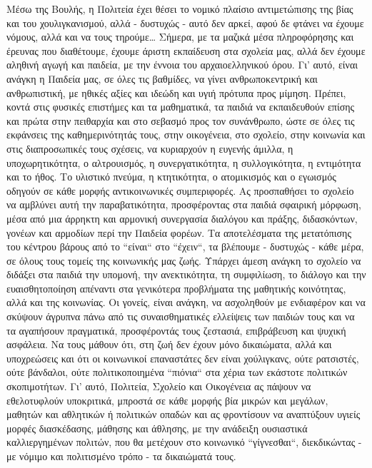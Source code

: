 \documentclass[12pt,a4paper]{book}
\begin{document}
\newline\setlength{\parindent}{40pt}\indent Μέσω της Βουλής, η Πολιτεία έχει
θέσει το νομικό πλαίσιο αντιμετώπισης της βίας και του χουλιγκανισμού,
αλλά - δυστυχώς - αυτό δεν αρκεί, αφού δε φτάνει να έχουμε νόμους, αλλά και να
τους τηρούμε\ldots
\newline\setlength{\parindent}{40pt}\indent Σήμερα, με τα μαζικά μέσα
πληροφόρησης και έρευνας που διαθέτουμε, έχουμε άριστη εκπαίδευση στα σχολεία
μας, αλλά δεν έχουμε αληθινή αγωγή και παιδεία, με την έννοια του
αρχαιοελληνικού όρου. Γι' αυτό, είναι ανάγκη η Παιδεία μας, σε όλες τις
βαθμίδες, να γίνει ανθρωποκεντρική και ανθρωπιστική, με ηθικές αξίες και ιδεώδη
και υγιή πρότυπα προς μίμηση. Πρέπει, κοντά στις φυσικές επιστήμες και τα
μαθηματικά, τα παιδιά να εκπαιδευθούν επίσης και πρώτα στην πειθαρχία και στο
σεβασμό προς τον συνάνθρωπο, ώστε σε όλες τις εκφάνσεις της καθημερινότητάς
τους, στην οικογένεια, στο σχολείο, στην κοινωνία και στις διαπροσωπικές τους
σχέσεις, να κυριαρχούν η ευγενής άμιλλα, η υποχωρητικότητα, ο αλτρουισμός, η
συνεργατικότητα, η συλλογικότητα, η εντιμότητα και το ήθος.
\newline\setlength{\parindent}{40pt}\indent Το υλιστικό πνεύμα, η κτητικότητα, ο ατομικισμός και ο εγωισμός οδηγούν σε κάθε μορφής αντικοινωνικές συμπεριφορές. Ας προσπαθήσει το σχολείο να αμβλύνει αυτή την παραβατικότητα, προσφέροντας στα παιδιά σφαιρική
μόρφωση, μέσα από μια άρρηκτη και αρμονική συνεργασία διαλόγου και πράξης,
διδασκόντων, γονέων και αρμοδίων περί την Παιδεία φορέων. Τα αποτελέσματα της
μετατόπισης του κέντρου βάρους από το ``είναι`` στο ``έχειν``, τα βλέπουμε -
δυστυχώς - κάθε μέρα, σε όλους τους τομείς της κοινωνικής μας ζωής. Υπάρχει
άμεση ανάγκη το σχολείο να διδάξει στα παιδιά την υπομονή, την ανεκτικότητα, τη
συμφιλίωση, το διάλογο και την ευαισθητοποίηση απέναντι στα γενικότερα
προβλήματα της μαθητικής κοινότητας, αλλά και της κοινωνίας.
\newline\setlength{\parindent}{40pt}\indent Οι γονείς, είναι ανάγκη, να
ασχοληθούν με ενδιαφέρον και να σκύψουν άγρυπνα πάνω από τις συναισθηματικές
ελλείψεις των παιδιών τους και να τα αγαπήσουν πραγματικά, προσφέροντάς τους
ζεστασιά, επιβράβευση και ψυχική ασφάλεια. Να τους μάθουν ότι, στη ζωή δεν έχουν
μόνο δικαιώματα, αλλά και υποχρεώσεις και ότι οι κοινωνικοί επαναστάτες δεν
είναι χούλιγκανς, ούτε ρατσιστές, ούτε βάνδαλοι, ούτε πολιτικοποιημένα
``πιόνια`` στα χέρια των εκάστοτε πολιτικών σκοπιμοτήτων.
\newline\setlength{\parindent}{40pt}\indent Γι' αυτό, Πολιτεία, Σχολείο και
Οικογένεια ας πάψουν να εθελοτυφλούν υποκριτικά, μπροστά σε κάθε μορφής βία
μικρών και μεγάλων, μαθητών και αθλητικών ή πολιτικών οπαδών και ας φροντίσουν
να αναπτύξουν υγιείς μορφές διασκέδασης, μάθησης και άθλησης, με την ανάδειξη
ουσιαστικά καλλιεργημένων πολιτών, που θα μετέχουν στο κοινωνικό ``γίγνεσθαι``,
διεκδικώντας - με νόμιμο και πολιτισμένο τρόπο - τα δικαιώματά τους.
\end{document}

